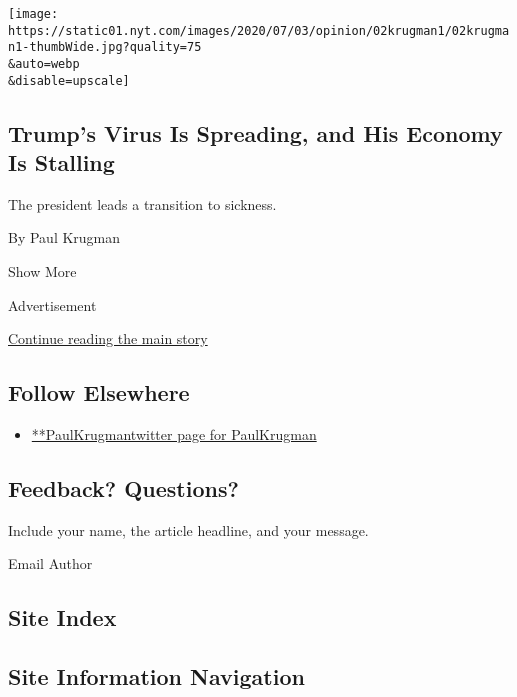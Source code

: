 \begin{enumerate}
  \texttt{[image: https://static01.nyt.com/images/2020/07/03/opinion/02krugman1/02krugman1-thumbWide.jpg?quality=75\\\&auto=webp\\\&disable=upscale]}

  \hypertarget{trumps-virus-is-spreading-and-his-economy-is-stalling}{%
  \subsection{Trump's Virus Is Spreading, and His Economy Is
  Stalling}\label{trumps-virus-is-spreading-and-his-economy-is-stalling}}

  The president leads a transition to sickness.

  By Paul Krugman
\end{enumerate}

Show More

Advertisement

\protect\hyperlink{after-mid2}{Continue reading the main story}

\hypertarget{follow-elsewhere}{%
\subsection{Follow Elsewhere}\label{follow-elsewhere}}

\begin{itemize}
\tightlist
\item
  \href{https://twitter.com/PaulKrugman}{**PaulKrugmantwitter page for
  PaulKrugman}
\end{itemize}

\hypertarget{feedback-questions}{%
\subsection{Feedback? Questions?}\label{feedback-questions}}

Include your name, the article headline, and your message.

Email Author

\hypertarget{site-index}{%
\subsection{Site Index}\label{site-index}}

\hypertarget{site-information-navigation}{%
\subsection{Site Information
Navigation}\label{site-information-navigation}}

